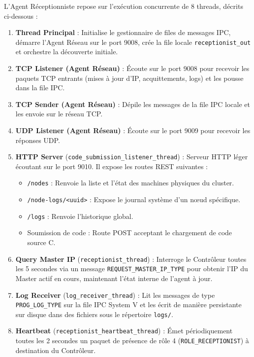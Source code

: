 \documentclass[12pt,a4paper]{report}
\begin{document}
L'Agent Réceptionniste repose sur l'exécution concurrente de 8 threads, décrits ci-dessous :
\begin{enumerate}
    \item \textbf{Thread Principal} : Initialise le gestionnaire de files de messages IPC, démarre l'Agent Réseau sur le port 9008, crée la file locale \texttt{receptionist\_out} et orchestre la découverte initiale.
    \item \textbf{TCP Listener (Agent Réseau)} : Écoute sur le port 9008 pour recevoir les paquets TCP entrants (mises à jour d'IP, acquittements, logs) et les pousse dans la file IPC.
    \item \textbf{TCP Sender (Agent Réseau)} : Dépile les messages de la file IPC locale et les envoie sur le réseau TCP.
    \item \textbf{UDP Listener (Agent Réseau)} : Écoute sur le port 9009 pour recevoir les réponses UDP.
    \item \textbf{HTTP Server} (\texttt{code\_submission\_listener\_thread}) : Serveur HTTP léger écoutant sur le port 9010. Il expose les routes REST suivantes :
        \begin{itemize}
            \item \texttt{/nodes} : Renvoie la liste et l'état des machines physiques du cluster.
            \item \texttt{/node-logs/<uuid>} : Expose le journal système d'un nœud spécifique.
            \item \texttt{/logs} : Renvoie l'historique global.
            \item Soumission de code : Route POST acceptant le chargement de code source C.
        \end{itemize}
    \item \textbf{Query Master IP} (\texttt{receptionist\_thread}) : Interroge le Contrôleur toutes les 5 secondes via un message \texttt{REQUEST\_MASTER\_IP\_TYPE} pour obtenir l'IP du Master actif en cours, maintenant l'état interne de l'agent à jour.
    \item \textbf{Log Receiver} (\texttt{log\_receiver\_thread}) : Lit les messages de type \texttt{PROG\_LOG\_TYPE} sur la file IPC System V et les écrit de manière persistante sur disque dans des fichiers sous le répertoire \texttt{logs/}.
    \item \textbf{Heartbeat} (\texttt{receptionist\_heartbeat\_thread}) : Émet périodiquement toutes les 2 secondes un paquet de présence de rôle 4 (\texttt{ROLE\_RECEPTIONIST}) à destination du Contrôleur.
\end{enumerate}
\end{document}
